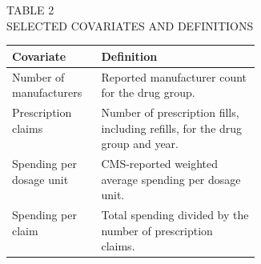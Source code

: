 \documentclass[12pt,letterpaper]{article}
\begin{document}
\begin{center}
{\small TABLE 2}\\[4pt]
{\footnotesize\MakeUppercase{Selected Covariates and Definitions}}\\[9pt]

\begin{minipage}{0.95\linewidth}
\small
\begin{tabularx}{\linewidth}{@{}>{\raggedright\arraybackslash}p{0.36\linewidth}X@{}}
\toprule
Covariate & Definition \\
\midrule
Number of manufacturers &
Reported manufacturer count for the drug group. \\
\addlinespace[6pt]
Prescription claims &
Number of prescription fills, including refills, for the drug group and year. \\
\addlinespace[6pt]
Spending per dosage unit &
CMS-reported weighted average spending per dosage unit. \\
\addlinespace[6pt]
Spending per claim &
Total spending divided by the number of prescription claims. \\
\bottomrule
\end{tabularx}
\end{minipage}
\end{center}
\end{document}
